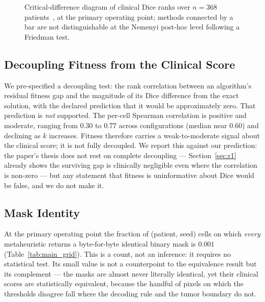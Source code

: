 \begin{figure}[t]
  \centering
  \caption{Critical-difference diagram of clinical Dice ranks over $n=368$
  patients~\cite{demsar_cd}, at the primary operating point; methods connected by
  a bar are not distinguishable at the Nemenyi post-hoc level following a
  Friedman test.}
  \label{fig:cd}
\end{figure}

\subsection{Decoupling Fitness from the Clinical Score}

We pre-specified a decoupling test: the rank correlation between an algorithm's
residual fitness gap and the magnitude of its Dice difference from the exact
solution, with the declared prediction that it would be approximately zero. That
prediction is \emph{not} supported. The per-cell Spearman correlation is
positive and moderate, ranging from $0.30$ to $0.77$ across configurations
(median near $0.60$) and declining as $k$ increases. Fitness therefore carries a
weak-to-moderate signal about the clinical score; it is not fully decoupled. We
report this against our prediction: the paper's thesis does not rest on complete
decoupling — Section~\ref{sec:r1} already shows the surviving gap is clinically
negligible even where the correlation is non-zero — but any statement that
fitness is uninformative about Dice would be false, and we do not make it.

\subsection{Mask Identity}

At the primary operating point the fraction of (patient, seed) cells on which
\emph{every} metaheuristic returns a byte-for-byte identical binary mask is
$0.001$ (Table~\ref{tab:main_grid}). This is a count, not an inference: it
requires no statistical test. Its small value is not a counterpoint to the
equivalence result but its complement — the masks are almost never literally
identical, yet their clinical scores are statistically equivalent, because the
handful of pixels on which the thresholds disagree fall where the decoding rule
and the tumor boundary do not.
